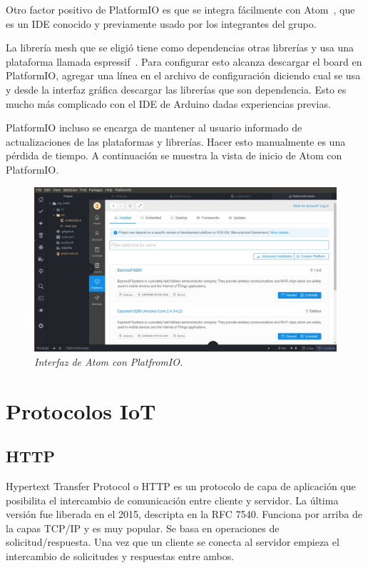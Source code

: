 Otro factor positivo de PlatformIO es que se integra fácilmente con Atom~\cite{Atom}, que es un IDE conocido y previamente usado por los integrantes del grupo.

La librería mesh que se eligió tiene como dependencias otras librerías y usa una plataforma llamada espressif~\cite{espressif-platformio}. Para configurar esto alcanza descargar el board en PlatformIO, agregar una línea en el archivo de configuración diciendo cual se usa y desde la interfaz gráfica descargar las librerías que son dependencia. Esto es mucho más complicado con el IDE de Arduino dadas experiencias previas.

PlatformIO incluso se encarga de mantener al usuario informado de actualizaciones de las plataformas y librerías. Hacer esto manualmente es una pérdida de tiempo. A continuación se muestra la vista de inicio de Atom con PlatformIO.~


\begin{figure}[h!]
  \centering
  \includegraphics[width=\textwidth, keepaspectratio]{images/platformio}
  \caption{\textit{Interfaz de Atom con PlatfromIO.}}
  \label{fig:atom-plat}
\end{figure}

\section{Protocolos IoT} \label{sec:protocolos}

\subsection{HTTP}

Hypertext Transfer Protocol o HTTP es un protocolo de capa de aplicación que posibilita el intercambio de comunicación entre cliente y servidor. La última versión fue liberada en el 2015,  descripta en la RFC 7540. Funciona por arriba de la capas TCP/IP y es muy popular. Se basa en operaciones de solicitud/respuesta. Una vez que un cliente se conecta al servidor empieza el intercambio de solicitudes y respuestas entre ambos.

